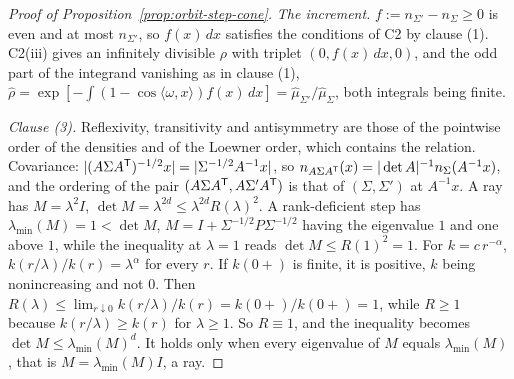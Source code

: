 \begin{proof}[Proof of Proposition~\ref{prop:orbit-step-cone}]
\emph{The increment.} $f := n_{\Sigma'} - n_\Sigma \ge 0$ is even and at most $n_{\Sigma'}$, so
$f(x)\,dx$ satisfies the conditions of C2 by clause (1). C2(iii) gives an infinitely divisible $\rho$
with triplet $(0, f(x)\,dx, 0)$, and the odd part of the integrand vanishing as in clause (1),
$\widehat\rho = \exp[-\int(1 - \cos\langle\omega,x\rangle)f(x)\,dx] =
\widehat\mu_{\Sigma'}/\widehat\mu_\Sigma$, both integrals being finite.

\emph{Clause (3).} Reflexivity, transitivity and antisymmetry are those of the pointwise order of
the densities and of the Loewner order, which contains the relation. Covariance:
$|(A\Sigma A^{\mathsf{T}})^{-1/2}x| = |\Sigma^{-1/2}A^{-1}x|$, so $n_{A\Sigma A^{\mathsf{T}}}(x) = |\det
A|^{-1}n_\Sigma(A^{-1}x)$, and the ordering of the pair $(A\Sigma A^{\mathsf{T}}, A\Sigma'A^{\mathsf{T}})$ is that of
$(\Sigma,\Sigma')$ at $A^{-1}x$. A ray has $M = \lambda^2I$, $\det M = \lambda^{2d} \le
\lambda^{2d}R(\lambda)^2$. A rank-deficient step has $\lambda_{\min}(M) = 1 < \det M$, $M = I + \Sigma^{-1/2}P\Sigma^{-1/2}$ having the eigenvalue $1$
and one above $1$, while the inequality at $\lambda = 1$ reads $\det M \le
R(1)^2 = 1$. For $k = c\,r^{-\alpha}$, $k(r/\lambda)/k(r) = \lambda^\alpha$ for every $r$. If $k(0{+})$ is
finite, it is positive, $k$ being nonincreasing and not $0$. Then $R(\lambda) \le \lim_{r\downarrow0}k(r/\lambda)/k(r) = k(0{+})/k(0{+})
= 1$, while $R \ge 1$ because $k(r/\lambda) \ge k(r)$ for $\lambda \ge 1$. So $R \equiv 1$, and the inequality
becomes $\det M \le \lambda_{\min}(M)^d$. It holds only when every eigenvalue of $M$ equals $\lambda_{\min}(M)$, that
is $M = \lambda_{\min}(M)I$, a ray.
\end{proof}

